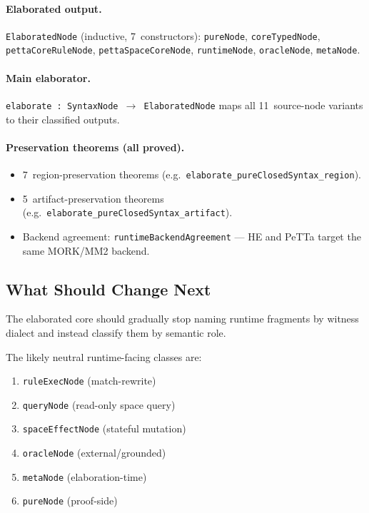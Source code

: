 \documentclass[11pt]{article}
\theoremstyle{remark}
\newcommand{\MORK}{\textup{MORK}}
\newcommand{\PeTTa}{\textup{PeTTa}}
\newcommand{\HE}{\textup{HE}}
\newcommand{\code}[1]{\texttt{#1}}
\newcommand{\leanref}[1]{\texttt{#1}}
\begin{document}
\paragraph{Elaborated output.}
\leanref{ElaboratedNode} (inductive, 7~constructors):
\code{pureNode}, \code{coreTypedNode}, \code{pettaCoreRuleNode},
\code{pettaSpaceCoreNode}, \code{runtimeNode}, \code{oracleNode},
\code{metaNode}.

\paragraph{Main elaborator.}
\leanref{elaborate : SyntaxNode $\to$ ElaboratedNode} maps all
11~source-node variants to their classified outputs.

\paragraph{Preservation theorems (all proved).}
\begin{itemize}[nosep]
  \item 7~region-preservation theorems (e.g.\
  \leanref{elaborate\_pureClosedSyntax\_region}).
  \item 5~artifact-preservation theorems (e.g.\
  \leanref{elaborate\_pureClosedSyntax\_artifact}).
  \item Backend agreement:
  \leanref{runtimeBackendAgreement} --- \HE{} and \PeTTa{} target the same
  \MORK{}/MM2 backend.
\end{itemize}

\subsection{What Should Change Next}

The elaborated core should gradually stop naming runtime fragments by witness
dialect and instead classify them by semantic role.

The likely neutral runtime-facing classes are:

\begin{enumerate}[nosep]
  \item \code{ruleExecNode} (match-rewrite)
  \item \code{queryNode} (read-only space query)
  \item \code{spaceEffectNode} (stateful mutation)
  \item \code{oracleNode} (external/grounded)
  \item \code{metaNode} (elaboration-time)
  \item \code{pureNode} (proof-side)
\end{enumerate}
\end{document}

